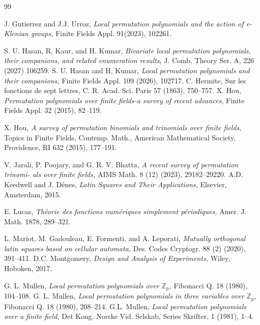 \documentclass[11pt]{amsart}
\theoremstyle{plain}
\numberwithin{equation}{section}
\begin{document}
\begin{thebibliography}{99}

 J. Gutierrez and J.J. Urroz, {\it Local permutation polynomials and the action of e-Klenian groups,} Finite Fields Appl.  91(2023), 102261.

 S. U. Hasan, R. Kaur, and H. Kumar, {\it Bivariate local permutation polynomials, their companions, and related enumeration results}, J. Comb. Theory Ser. A, 226 (2027) 106259.
 S. U. Hasan and H. Kumar, {\it Local permutation polynomials and their companions,} Finite Fields Appl. 109 (2026), 102717.
 C. Hermite, Sur les fonctions de sept lettres, C. R. Acad. Sci. Paris 57 (1863), 750--757.
 X. Hou, {\it Permutation polynomials over finite fields-a survey of recent advances},
Finite Fields Appl. 32 (2015), 82--119.

  X. Hou, {\it A survey of permutation binomials and trinomials over finite fields}, Topics in Finite Fields, Contemp. Math., American Mathematical Society, Providence, RI 632 (2015), 177--191.

 V. Jarali, P. Poojary, and G. R. V. Bhatta, {\it A recent survey of permutation trinomi-
als over finite fields,} AIMS Math. 8 (12) (2023), 29182–29220.
 A.D. Keedwell and J. Dénes, {\it Latin Squares and Their Applications,} Elsevier, Amsterdam, 2015.

 E. Lucas, {\it Théorie des fonctions numériques simplement périodiques,} Amer. J. Math. 1878, 289--321.

 L. Mariot, M. Gadouleau, E. Formenti, and A. Leporati, {\it Mutually orthogonal latin squares based on cellular automata,} Des. Codes Cryptogr. 88 (2) (2020), 391--411.
  D.C. Montgomery, {\it Design and Analysis of Experiments,} Wiley, Hoboken, 2017.

 G. L. Mullen, {\it Local permutation polynomials over $\mathbb{Z}_p$,} Fibonacci Q. 18 (1980), 104--108.
 G. L. Mullen, {\it Local permutation polynomials in three variables over $\mathbb{Z}_p$,} Fibonacci Q. 18 (1980),
208--214.
 G.L. Mullen, {\it Local permutation polynomials over a finite field,} Det Kong. Norske Vid. Selskab, Series Skrifter, 1 (1981), 1--4.


\end{thebibliography}
\end{document}
